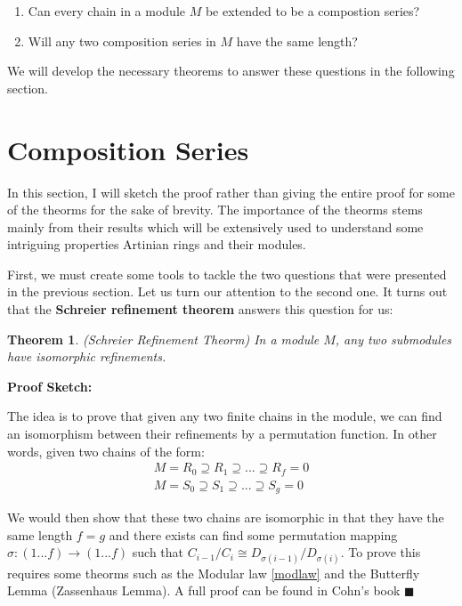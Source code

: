 \documentclass[11pt]{article}
\newtheorem{theorem}{Theorem}[section]
\begin{document}
\begin{enumerate}[1.]
 \item Can every chain in a module $M$ be extended to be a compostion series?
 \item Will any two composition series in $M$ have the same length?
\end{enumerate} 

\noindent
We will develop the necessary theorems to answer these questions in the following section. 

\section{Composition Series}

In this section, I will sketch the proof rather than giving the entire proof for some of the theorms for the sake of brevity. The importance of the theorms stems mainly from their results which will be extensively used to understand some intriguing properties Artinian rings and their modules. \newline

First, we must create some tools to tackle the two questions that were presented in the previous section. Let us turn our attention to the second one. It turns out that the \textbf{Schreier refinement theorem} answers this question for us: \newline

\noindent
\begin{theorem}(Schreier Refinement Theorm) In a module $M$, any two submodules have isomorphic refinements. \end{theorem}

\noindent
\textbf{Proof Sketch:} \newline

The idea is to prove that given any two finite chains in the module, we can find an isomorphism between their refinements by a permutation function. In other words, given two chains of the form:
\begin{gather}
 M = R_0 \supseteq R_1 \supseteq ... \supseteq R_f = 0 \\
 M = S_0 \supseteq S_1 \supseteq ... \supseteq S_g = 0
\end{gather}

We would then show that these two chains are isomorphic in that they have the same length $f = g$ and there exists  can find some permutation mapping $\sigma: (1...f) \rightarrow (1...f)$ such that $C_{i-1}/C_i \cong D_{\sigma(i-1)}/D_{\sigma(i)}$. To prove this requires some theorms such as the Modular law \eqref{modlaw} and the Butterfly Lemma (Zassenhaus Lemma). A full proof can be found in Cohn's book \cite{cohn04} $\blacksquare$ \newline
\end{document}
